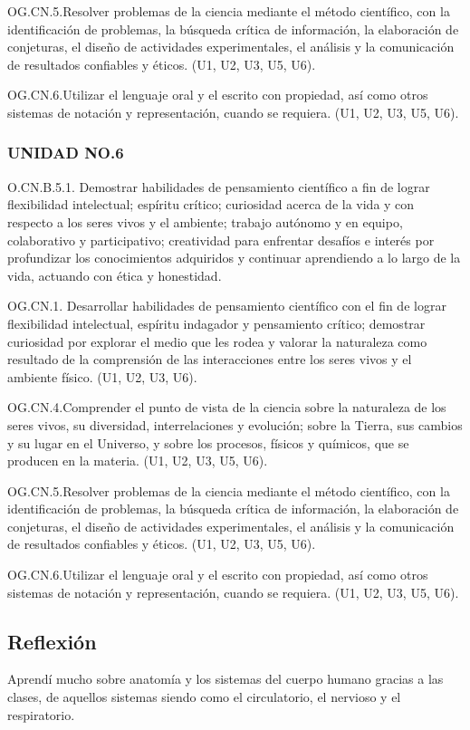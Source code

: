 \documentclass[a4paper, 12pt]{article}
\begin{document}
OG.CN.5.Resolver problemas de la ciencia mediante el método científico, con la identificación de problemas, la búsqueda crítica de información, la elaboración de conjeturas, el diseño de actividades experimentales, el análisis y la comunicación de resultados confiables y éticos. (U1, U2, U3, U5, U6).

OG.CN.6.Utilizar el lenguaje oral y el escrito con propiedad, así como otros sistemas de notación y representación, cuando se requiera. (U1, U2, U3, U5, U6).


\subsubsection{UNIDAD NO.6}

O.CN.B.5.1. Demostrar habilidades de pensamiento científico a fin de lograr flexibilidad intelectual; espíritu crítico; curiosidad acerca de la vida y con respecto a los seres vivos y el ambiente; trabajo autónomo y en equipo, colaborativo y participativo; creatividad para enfrentar desafíos e interés por profundizar los conocimientos adquiridos y continuar aprendiendo a lo largo de la vida, actuando con ética y honestidad.

OG.CN.1. Desarrollar habilidades de pensamiento científico con el fin de lograr flexibilidad intelectual, espíritu indagador y pensamiento crítico; demostrar curiosidad por explorar el medio que les rodea y valorar la naturaleza como resultado de la comprensión de las interacciones entre los seres vivos y el ambiente físico. (U1, U2, U3, U6).

OG.CN.4.Comprender el punto de vista de la ciencia sobre la naturaleza de los seres vivos, su diversidad, interrelaciones y evolución; sobre la Tierra, sus cambios y su lugar en el Universo, y sobre los procesos, físicos y químicos, que se producen en la materia. (U1, U2, U3, U5, U6).

OG.CN.5.Resolver problemas de la ciencia mediante el método científico, con la identificación de problemas, la búsqueda crítica de información, la elaboración de conjeturas, el diseño de actividades experimentales, el análisis y la comunicación de resultados confiables y éticos. (U1, U2, U3, U5, U6).

OG.CN.6.Utilizar el lenguaje oral y el escrito con propiedad, así como otros sistemas de notación y representación, cuando se requiera. (U1, U2, U3, U5, U6).

\subsection{Reflexión}
Aprendí mucho sobre anatomía y los sistemas del cuerpo humano gracias a las clases, de aquellos sistemas siendo como el circulatorio, el nervioso y el respiratorio.
\end{document}
